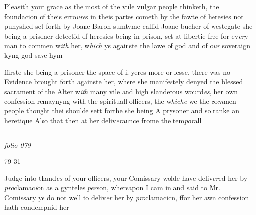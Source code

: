 \documentclass[12pt, a4paper]{book}
\begin{document}
            		
				\marginpar[\vspace{0.5cm}{\textcolor{Gray}{the pardon n}}]{}
			
            		
		\ifthenelse{\isodd{\thepage}}
		{\reversemarginpar}
		{\normalmarginpar}
		Pleasith your grace as the most of the vule
  vulgar people thinketh, the foundacion of theis
 erro\textit{ure}s in theis partes cometh by the fawte of
 heresies not punyshed set forth by Joane Baron
 sumtyme callid Joane bucher of westegate she being
 a prisoner detectid of heresies being in prison, set
  at libertie free for ev\textit{er}y man to commen w\textit{ith} her, w\textit{hich}
  ys againste the lawe of god and of o\textit{ur} soveraign kyng
 god save hym
            	
            		
				\marginpar[\vspace{0.5cm}{\textcolor{Gray}{n}}]{}
			
            		
		\ifthenelse{\isodd{\thepage}}
		{\reversemarginpar}
		{\normalmarginpar}
		ffirste she being a prisoner the space of ii yeres
 more or lesse, there was no Evidence brought
 forth againste her, where she manifestely denyed
 the blessed sacrament of the Alter w\textit{ith} many vile
 and high slanderous wourd\textit{es}, her own confession
 remaynyng with the spirituall officers, the w\textit{hiche}
  we the co\textit{m}men people thought thei shoulde sett forthe
 she being A prysoner and so ranke an heretique
 Also that then at her deliv\textit{er}aunce frome the tem\textit{por}all


\dotfill
					  \subsection*{}

\textit{folio 079}


\begin{flushright}{\color{Mahogany}79} 31\end{flushright}
	
		\ifthenelse{\isodd{\thepage}}
		{\reversemarginpar}
		{\normalmarginpar}
		Judge into thand\textit{es} of your officers, your Comissary
 wolde have deliv\textit{er}ed her by \textit{pro}clamac\textit{i}on as a gynteles
		\textit{per}son, whereapon I cam in and said to Mr. Comissary
 ye do not well to deliv\textit{er} her by \textit{pro}clamacion, ffor her
 awn confession hath condempnid her
	
				\marginpar[\vspace{0.5cm}{\textcolor{Gray}{n}}]{}
			
\end{document}
